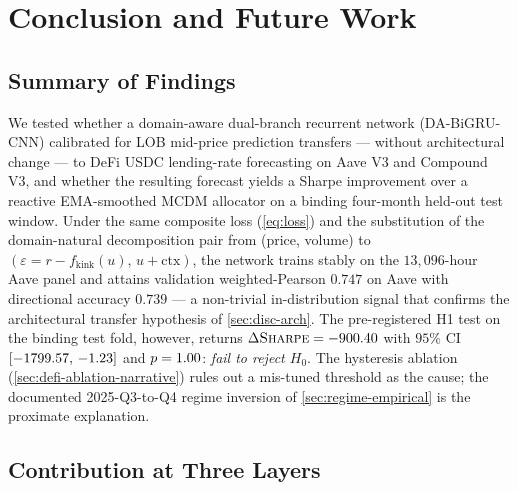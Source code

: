 
\section{Conclusion and Future Work}
\label{sec:conclusion}

\subsection{Summary of Findings}
\label{sec:summary}

We tested whether a domain-aware dual-branch recurrent network
(DA-BiGRU-CNN) calibrated for LOB mid-price prediction
\cite{solovev2026lob} transfers --- without architectural change ---
to DeFi USDC lending-rate forecasting on Aave V3 and Compound V3,
and whether the resulting forecast yields a Sharpe improvement
over a reactive EMA-smoothed MCDM allocator on a binding four-month
held-out test window. Under the same composite loss
(\cref{eq:loss}) and the substitution of the domain-natural
decomposition pair from (price, volume) to
$(\varepsilon = r-f_{\text{kink}}(u),\, u+\text{ctx})$, the network
trains stably on the $13{,}096$-hour Aave panel and attains
validation weighted-Pearson $0.747$ on Aave with directional
accuracy $0.739$ --- a non-trivial in-distribution signal that
confirms the architectural transfer hypothesis of
\cref{sec:disc-arch}. The pre-registered H1 test on the binding
test fold, however, returns
$\Delta\textsc{Sharpe}=-900.40{}$ with $95\%$ CI
$[-1799.57{},\,-1.23{}]$ and
$p=1.00{}$: \emph{fail to reject $H_0$}. The
hysteresis ablation (\cref{sec:defi-ablation-narrative}) rules out
a mis-tuned threshold as the cause; the documented
2025-Q3-to-Q4 regime inversion of \cref{sec:regime-empirical} is
the proximate explanation.

\subsection{Contribution at Three Layers}
\label{sec:contribution-layers}

